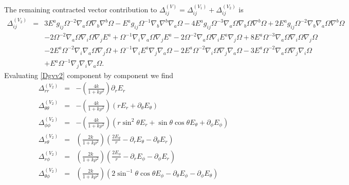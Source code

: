 \documentclass[10pt,letterpaper]{article}
\numberwithin{equation}{section}
\begin{document}
The remaining contracted vector contribution to $\Delta_{ij}^{(V)} = \Delta_{ij}^{(V_1)}+\Delta_{ij}^{(V_2)}$ is 
\begin{eqnarray}
\Delta_{ij}^{(V_2)}&=&3 E^{a} g_{ij} \Omega^{-2} \nabla_{a}\Omega \nabla_{b}\nabla^{b}\Omega
-  E^{a} g_{ij} \Omega^{-1} \nabla_{b}\nabla^{b}\nabla_{a}\Omega
- 4 E^{a} g_{ij} \Omega^{-3} \nabla_{a}\Omega \nabla_{b}\Omega \nabla^{b}\Omega
+ 2 E^{a} g_{ij} \Omega^{-2} \nabla_{b}\nabla_{a}\Omega \nabla^{b}\Omega
\nonumber\\
&& - 2 \Omega^{-2} \nabla_{a}\Omega \nabla_{i}\Omega \nabla_{j}E^{a}
+ \Omega^{-1} \nabla_{i}\nabla_{a}\Omega \nabla_{j}E^{a}
- 2 \Omega^{-2} \nabla_{a}\Omega \nabla_{i}E^{a} \nabla_{j}\Omega
+ 8 E^{a} \Omega^{-3} \nabla_{a}\Omega \nabla_{i}\Omega \nabla_{j}\Omega\nonumber\\
&& - 2 E^{a} \Omega^{-2} \nabla_{i}\nabla_{a}\Omega \nabla_{j}\Omega
+ \Omega^{-1} \nabla_{i}E^{a} \nabla_{j}\nabla_{a}\Omega
- 2 E^{a} \Omega^{-2} \nabla_{i}\Omega \nabla_{j}\nabla_{a}\Omega - 3 E^{a} \Omega^{-2} \nabla_{a}\Omega \nabla_{j}\nabla_{i}\Omega
\nonumber\\
&&+ E^{a} \Omega^{-1} \nabla_{j}\nabla_{i}\nabla_{a}\Omega.
\label{Dgvv2}
\end{eqnarray}
Evaluating \eqref{Dgvv2} component by component we find
\begin{eqnarray}
\Delta_{rr}^{(V_2)}&=& -\left(\frac{4k}{1+k\rho^2}\right)\partial_r E_r
\nonumber\\
\Delta_{\theta\theta}^{(V_2)}&=& -\left(\frac{4k}{1+k\rho^2}\right)(rE_r+\partial_\theta E_\theta)
\nonumber\\
\Delta_{\phi\phi}^{(V_2)}&=&-\left(\frac{4k}{1+k\rho^2}\right) ( r\sin^2\theta E_r+\sin\theta\cos\theta E_\theta +\partial_\phi E_\phi)
\nonumber\\
\Delta_{r\theta}^{(V_2)}&=& \left(\frac{2k}{1+k\rho^2}\right)\left(\frac{2E_\theta}{r}-\partial_r E_\theta - \partial_\theta E_r\right)
\nonumber\\
\Delta_{r\phi}^{(V_2)}&=& \left(\frac{2k}{1+k\rho^2}\right)\left(\frac{2E_\phi}{r}-\partial_r E_\phi - \partial_\phi E_r\right)
\nonumber\\
\Delta_{\theta\phi}^{(V_2)}&=& \left(\frac{2k}{1+k\rho^2}\right)\left( 2\sin^{-1}\theta\cos\theta E_\phi - \partial_\theta E_\phi - \partial_\phi E_\theta\right)
\label{Dgv22}
\end{eqnarray}
\end{document}
